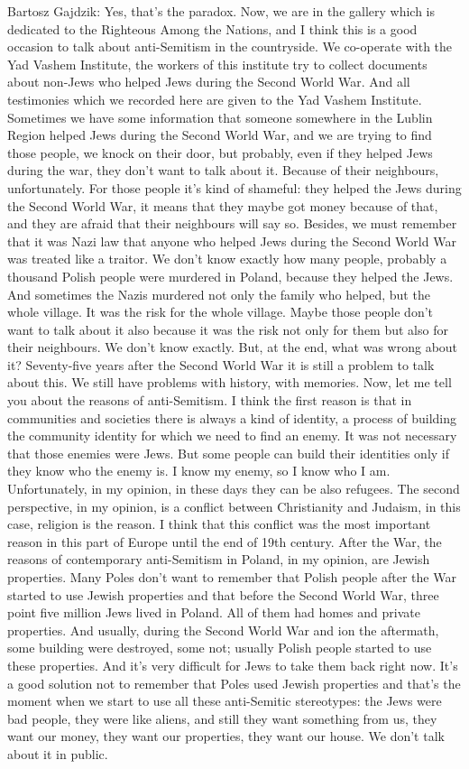 Bartosz Gajdzik: Yes, that’s the paradox. Now, we are in the gallery which is dedicated to the Righteous Among the Nations, and I think this is a good occasion to talk about anti-Semitism in the countryside. We co-operate with the Yad Vashem Institute, the workers of this institute try to collect documents about non-Jews who helped Jews during the Second World War. And all testimonies which we recorded here are given to the Yad Vashem Institute. Sometimes we have some information that someone somewhere in the Lublin Region helped Jews during the Second World War, and we are trying to find those people, we knock on their door, but probably, even if they helped Jews during the war, they don’t want to talk about it. Because of their neighbours, unfortunately. For those people it’s kind of shameful: they helped the Jews during the Second World War, it means that they maybe got money because of that, and they are afraid that their neighbours will say so. Besides, we must remember that it was Nazi law that anyone who helped Jews during the Second World War was treated like a traitor. We don’t know exactly how many people, probably a thousand Polish people were murdered in Poland, because they helped the Jews. And sometimes the Nazis murdered not only the family who helped, but the whole village. It was the risk for the whole village. Maybe those people don’t want to talk about it also because it was the risk not only for them but also for their neighbours. We don’t know exactly. But, at the end, what was wrong about it? Seventy-five years after the Second World War it is still a problem to talk about this. We still have problems with history, with memories.  
Now, let me tell you about the reasons of anti-Semitism. I think the first reason is that in communities and societies there is always a kind of identity, a process of building the community identity for which we need to find an enemy. It was not necessary that those enemies were Jews. But some people can build their identities only if they know who the enemy is. I know my enemy, so I know who I am. Unfortunately, in my opinion, in these days they can be also refugees. The second perspective, in my opinion, is a conflict between Christianity and Judaism, in this case, religion is the reason. I think that this conflict was the most important reason in this part of Europe until the end of 19th century. After the War, the reasons of contemporary anti-Semitism in Poland, in my opinion, are Jewish properties. Many Poles don’t want to remember that Polish people after the War started to use Jewish properties and that before the Second World War, three point five million Jews lived in Poland. All of them had homes and private properties. And usually, during the Second World War and ion the aftermath, some building were destroyed, some not; usually Polish people started to use these properties. And it’s very difficult for Jews to take them back right now. It’s a good solution not to remember that Poles used Jewish properties and that’s the moment when we start to use all these anti-Semitic stereotypes: the Jews were bad people, they were like aliens, and still they want something from us, they want our money, they want our properties, they want our house. We don’t talk about it in public. 

